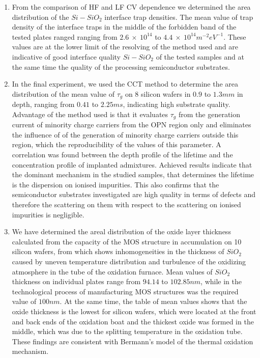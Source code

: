 \begin{enumerate}
\item From the comparison of HF and LF CV dependence we determined the
  area distribution of the $Si-SiO_{2}$ interface trap densities. The
  mean value of trap density of the interface traps in the middle of
  the forbidden band of the tested plates ranged ranging from
  $2.6\ \times\ 10^{14}$ to $4.4\ \times\ 10^{14}m^{-2}eV^{-1}$. These
  values are at the lower limit of the resolving of the method used
  and are indicative of good interface quality $Si-SiO_{2}$ of the
  tested samples and at the same time the quality of the processing
  semiconductor substrates.

\item In the final experiment, we used the CCT method to determine the
  area distribution of the mean value of $\tau_{g}$ on 8 silicon
  wafers in $0.9$ to $1.3 mm$ in depth, ranging from $0.41$ to $2.25
  ms$, indicating high substrate quality.
  \newline Advantage of the method used is that it evaluates
  $\tau_{g}$ from the generation current of minority charge carriers
  from the OPN region only and eliminates the influence of of the
  generation of minority charge carriers outside this region, which
  the reproducibility of the values of this parameter.
  \newline A correlation was found between the depth profile of the
  lifetime and the concentration profile of implanted
  admixtures. Achieved results indicate that the dominant mechanism in
  the studied samples, that determines the lifetime is the dispersion
  on ionised impurities. This also confirms that the semiconductor
  substrates investigated are high quality in terms of defects and
  therefore the scattering on them with respect to the scattering on
  ionised impurities is negligible.

\item We have determined the areal distribution of the oxide layer
  thickness calculated from the capacity of the MOS structure in
  accumulation on 10 silicon wafers, from which shows inhomogeneities
  in the thickness of $SiO_{2}$ caused by uneven temperature
  distribution and turbulence of the oxidizing atmosphere in the tube
  of the oxidation furnace. \newline Mean values of $SiO_{2}$
  thickness on individual plates range from $94.14$ to $102.85 nm$,
  while in the technological process of manufacturing MOS structures
  was the required value of $100 nm$. \newline At the same time, the
  table of mean values shows that the oxide thickness is the lowest
  for silicon wafers, which were located at the front and back ends of
  the oxidation boat and the thickest oxide was formed in the middle,
  which was due to the splitting temperature in the oxidation
  tube. These findings are consistent with Bermann's model of the
  thermal oxidation mechanism.


\end{enumerate}
